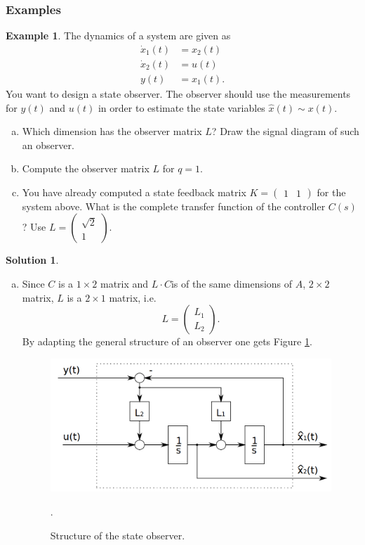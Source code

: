 \documentclass[a4paper,12 pt]{article}
\numberwithin{equation}{section}
\theoremstyle{definition}
\newtheorem{bsp}{Example}
\theoremstyle{remark}
\theoremstyle{definition}
\newtheorem*{lsg}{Solution}
\theoremstyle{definition}
\theoremstyle{definition}
\theoremstyle{remark}
\begin{document}
\subsubsection{Examples}
\begin{bsp}
The dynamics of a system are given as
\begin{equation*}
\begin{split}
\dot{x}_1(t)&=x_2(t)\\
\dot{x}_2(t)&=u(t)\\
y(t)&=x_1(t).
\end{split}
\end{equation*}
You want to design a state observer. The observer should use the measurements for $y(t)$ and $u(t)$ in order to estimate the state variables $\hat{x}(t)\sim x(t)$.
\begin{enumerate}[(a)]
\item Which dimension has the observer matrix $L$? Draw the signal diagram of such an observer.
\item Compute the observer matrix $L$ for $q=1$.
\item You have already computed a state feedback matrix $K=\begin{pmatrix} 1&1 \end{pmatrix}$ for the system above. What is the complete transfer function of the controller $C(s)$? Use $L=\begin{pmatrix} \sqrt{2} \\ 1 \end{pmatrix}$.
\end{enumerate}

\newpage
\begin{lsg}
\
\begin{enumerate}[(a)]
\item Since $C$ is a $1\times 2$ matrix and $L\cdot C$is of the same dimensions of $A$, $2\times 2$ matrix, $L$ is a $2 \times 1$ matrix, i.e.
\begin{equation*}
L=\begin{pmatrix} L_1 \\ L_2 \end{pmatrix}.
\end{equation*}
By adapting the general structure of an observer one gets Figure \ref{fig:lqg3}.

\begin{figure}[h]
\centering
\includegraphics[width=0.6\columnwidth]{lqg3}
\caption{Structure of the state observer.}
\label{fig:lqg3}.
\end{figure}


\end{enumerate}
\end{lsg}
\end{bsp}
\end{document}
